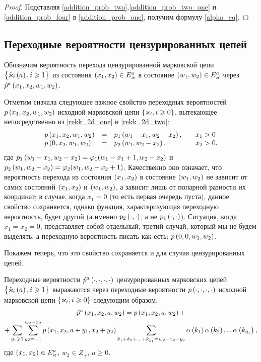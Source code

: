 \documentclass[a4paper,14pt,russian]{article}
\newcommand{\Markk}[0]{\brrr{ \vk_i, i \geqslant 0}}
\newcommand{\Markkhata}[0]{\brrr{ \hat{\vk}_i\br{a}, i \geqslant 1}}
\newcommand{\p}{\hat{p}}
\begin{document}
\begin{proof}
Подставляя \eqref{addition_prob_two},\eqref{addition_prob_two_one} и \eqref{addition_prob_four}  в  \eqref{addition_prob_one}, получим формулу 
\eqref{alpha_eq}.

 \end{proof}
\subsection{Переходные вероятности цензурированных цепей}

Обозначим вероятность перехода цензурированной марковской цепи $\Markkhata$ из состояния $\left(x_1,x_2\right) \in E_{\varkappa}^a$ 
в состояние $\left(w_1,w_2\right) \in E_{\varkappa}^a $ через $\p^a \br{x_1,x_2,w_1,w_2}$.

Отметим сначала следующее важное свойство переходных вероятностей $p \left(x_1, x_2, w_1, w_2\right)$ исходной марковской цепи $\Markk$, вытекающее непосредственно из \eqref{rekk_2d_one} и \eqref{rekk_2d_two}:
\begin{equation}
\begin{array}{llll}
\displaystyle p \left(x_1, x_2, w_1, w_2\right) &=& p_1 \left(w_1 - x_1, w_2 - x_2\right),& \quad x_1 > 0\\
\displaystyle p \left(0, x_2, w_1, w_2\right) &=& p_2 \left(w_1, w_2 - x_2\right),&\quad x_2 > 0,
\end{array}
\label{transition_property:1}
\end{equation}
где $p_1 \left(w_1 - x_1, w_2 - x_2\right) = \varphi_1(w_1- x_1 + 1,w_2- x_2)$ и $p_2 \left(w_1, w_2 - x_2\right) = \varphi_2(w_1,w_2- x_2 + 1)$.
Качественно оно означает, что вероятность перехода из состояния $\left(x_1,x_2\right)$ в состояние $\left(w_1,w_2\right)$ не зависит от самих состояний $\left(x_1,x_2\right)$ и $\left(w_1,w_2\right)$, 
а зависит лишь от попарной разности их координат; в случае, когда $x_1 = 0$ (то есть первая очередь пуста), данное свойство сохраняется, однако функция, 
характеризующая переходную вероятность, будет другой (а именно $p_2\left(\cdot,\cdot\right)$, а не $p_1\left(\cdot,\cdot\right)$). Ситуация, когда $x_1 = x_2 = 0$, представляет собой отдельный, третий случай, 
который мы не будем выделять, а переходную вероятность писать как есть: $p \left(0, 0, w_1, w_2\right)$.

Покажем теперь, что это свойство сохраняется и для случая цензурированных цепей.

\begin{lemma}
Переходные вероятности $\p^a \br{\cdot,\cdot,\cdot,\cdot}$ цензурированных марковских цепей $\Markkhata$ выражаются через переходные вероятности
$p\left(\cdot,\cdot,\cdot,\cdot\right)$
исходной марковской цепи $\Markk$ 
следующим образом:
\begin{multline}
\p^a \br{x_1, x_2, a, w_2} = p \br{x_1, x_2, a, w_2}  + \\+ 
\sum_{y_1 \geqslant 1} \sum_{y_2 = -1}^{w_2 - x_2} p\br{x_1, x_2, a + y_1, x_2 + y_2}
\sum_{k_1 + k_2 + \ldots + k_{y_1} = w_2 - x_2- y_2} \alpha\br{k_1} \alpha\br{k_2} \ldots \alpha\br{k_{y_1}},
\label{transition_two}
\end{multline}
где $\left(x_1,x_2\right) \in E^a_{\varkappa}$, $w_2 \in Z_+$, $a \geq 0$.
\end{lemma}
\end{document}
